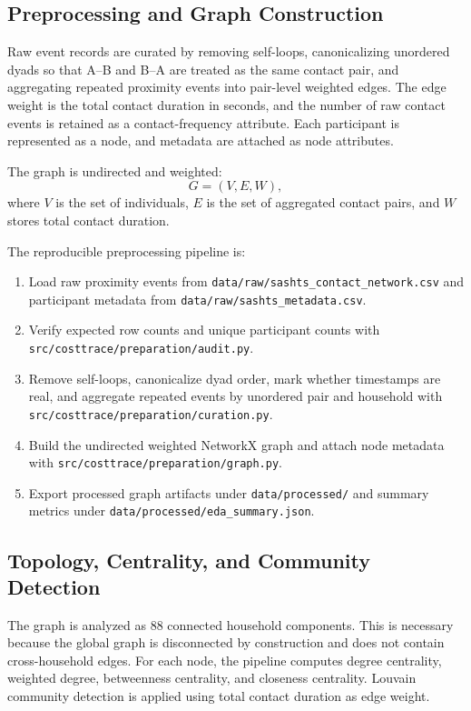 \documentclass[11pt,a4paper]{article}
\begin{document}
\subsection{Preprocessing and Graph Construction}

Raw event records are curated by removing self-loops, canonicalizing unordered dyads so that A--B and B--A are treated as the same contact pair, and aggregating repeated proximity events into pair-level weighted edges. The edge weight is the total contact duration in seconds, and the number of raw contact events is retained as a contact-frequency attribute. Each participant is represented as a node, and metadata are attached as node attributes.

The graph is undirected and weighted:
\[
G = (V, E, W),
\]
where \(V\) is the set of individuals, \(E\) is the set of aggregated contact pairs, and \(W\) stores total contact duration.

The reproducible preprocessing pipeline is:

\begin{enumerate}
  \item Load raw proximity events from \texttt{data/raw/sashts\_contact\_network.csv} and participant metadata from \texttt{data/raw/sashts\_metadata.csv}.
  \item Verify expected row counts and unique participant counts with \texttt{src/costtrace/preparation/audit.py}.
  \item Remove self-loops, canonicalize dyad order, mark whether timestamps are real, and aggregate repeated events by unordered pair and household with \texttt{src/costtrace/preparation/curation.py}.
  \item Build the undirected weighted NetworkX graph and attach node metadata with \texttt{src/costtrace/preparation/graph.py}.
  \item Export processed graph artifacts under \texttt{data/processed/} and summary metrics under \texttt{data/processed/eda\_summary.json}.
\end{enumerate}

\subsection{Topology, Centrality, and Community Detection}

The graph is analyzed as 88 connected household components. This is necessary because the global graph is disconnected by construction and does not contain cross-household edges. For each node, the pipeline computes degree centrality, weighted degree, betweenness centrality, and closeness centrality. Louvain community detection is applied using total contact duration as edge weight.
\end{document}
